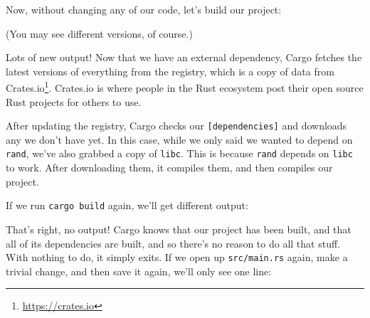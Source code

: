 \documentclass[a4paper,]{book}
\newenvironment{Shaded}{\begin{snugshade}}{\end{snugshade}}
\newcommand{\KeywordTok}[1]{\textcolor[rgb]{0.13,0.29,0.53}{\textbf{{#1}}}}
\newcommand{\NormalTok}[1]{{#1}}
\renewcommand{\href}[2]{#2\footnote{\url{#1}}}
\begin{document}
Now, without changing any of our code, let's build our project:

\begin{Shaded}
\end{Shaded}

(You may see different versions, of course.)

Lots of new output! Now that we have an external dependency, Cargo
fetches the latest versions of everything from the registry, which is a
copy of data from \href{https://crates.io}{Crates.io}. Crates.io is
where people in the Rust ecosystem post their open source Rust projects
for others to use.

After updating the registry, Cargo checks our
\texttt{{[}dependencies{]}} and downloads any we don't have yet. In this
case, while we only said we wanted to depend on \texttt{rand}, we've
also grabbed a copy of \texttt{libc}. This is because \texttt{rand}
depends on \texttt{libc} to work. After downloading them, it compiles
them, and then compiles our project.

If we run \texttt{cargo\ build} again, we'll get different output:

\begin{Shaded}
\end{Shaded}

That's right, no output! Cargo knows that our project has been built,
and that all of its dependencies are built, and so there's no reason to
do all that stuff. With nothing to do, it simply exits. If we open up
\texttt{src/main.rs} again, make a trivial change, and then save it
again, we'll only see one line:

\begin{Shaded}
\end{Shaded}
\end{document}
